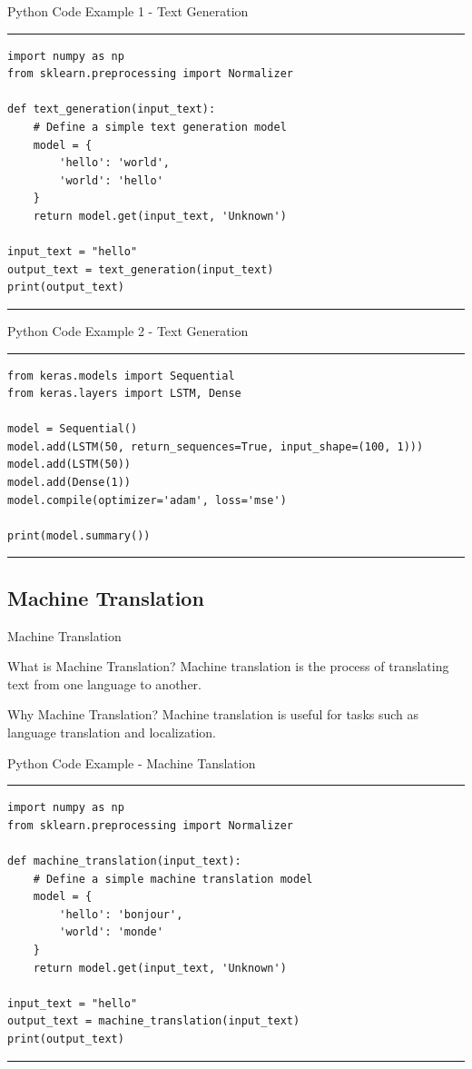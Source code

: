 \documentclass[aspectratio=169, hideothersubsections]{beamer}
\begin{document}
\begin{frame}[fragile]{Python Code Example 1 - Text Generation}
\rule{\textwidth}{1pt}
\scriptsize
\begin{verbatim}
import numpy as np
from sklearn.preprocessing import Normalizer

def text_generation(input_text):
    # Define a simple text generation model
    model = {
        'hello': 'world',
        'world': 'hello'
    }
    return model.get(input_text, 'Unknown')

input_text = "hello"
output_text = text_generation(input_text)
print(output_text)
\end{verbatim}
\rule{\textwidth}{1pt}
\end{frame}

\begin{frame}[fragile]{Python Code Example 2 - Text Generation}
\rule{\textwidth}{1pt}
\scriptsize
\begin{verbatim}
from keras.models import Sequential
from keras.layers import LSTM, Dense

model = Sequential()
model.add(LSTM(50, return_sequences=True, input_shape=(100, 1)))
model.add(LSTM(50))
model.add(Dense(1))
model.compile(optimizer='adam', loss='mse')

print(model.summary())
\end{verbatim}
\rule{\textwidth}{1pt}
\end{frame}


\subsection{Machine Translation}

\begin{frame}[fragile]{Machine Translation}
  \begin{block}{What is Machine Translation?}
    Machine translation is the process of translating text from one language to another.
  \end{block}
  \begin{block}{Why Machine Translation?}
    Machine translation is useful for tasks such as language translation and localization.
  \end{block}
\end{frame}

\begin{frame}[fragile]{Python Code Example - Machine Tanslation}
\rule{\textwidth}{1pt}
\scriptsize
\begin{verbatim}
import numpy as np
from sklearn.preprocessing import Normalizer

def machine_translation(input_text):
    # Define a simple machine translation model
    model = {
        'hello': 'bonjour',
        'world': 'monde'
    }
    return model.get(input_text, 'Unknown')

input_text = "hello"
output_text = machine_translation(input_text)
print(output_text)
\end{verbatim}
\rule{\textwidth}{1pt}
\end{frame}
\end{document}
